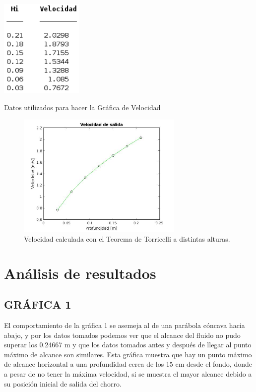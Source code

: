 \documentclass[journal,transmag]{IEEEtran}
\begin{document}
\begin{table}[!h]
\center
\includegraphics[width=4cm]{tabla7.png}
\caption{Datos utilizados para hacer la Gráfica de Velocidad}
\label{T7}
\end{table}
  \begin{figure}[!h]
\center
\includegraphics[width=8cm]{grafica3.jpg}
\caption{Velocidad calculada con el Teorema de Torricelli a distintas alturas.}
\label{G3}
\end{figure} 

\section{Análisis de resultados}
\subsection{GRÁFICA 1}
El comportamiento de la gráfica 1 se asemeja al de una parábola cóncava hacia abajo, y por los datos tomados podemos ver que el alcance del fluido no pudo superar los 0.24667 m y que los datos tomados antes y después de llegar al punto máximo de alcance son similares. Esta gráfica muestra que hay un punto máximo de alcance horizontal a una profundidad cerca de los 15 cm desde el fondo, donde a pesar de no tener la máxima velocidad, si se muestra el mayor alcance debido a su posición inicial de salida del chorro. 
\end{document}
